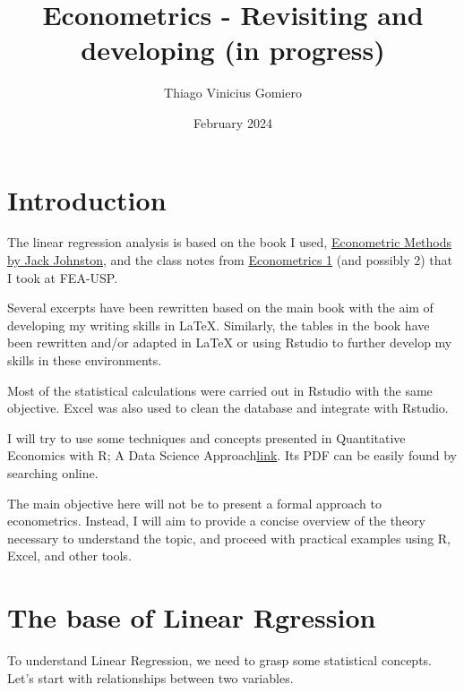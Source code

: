 \documentclass{article} %
\title{Econometrics - Revisiting and developing (in progress)} %
\author{Thiago  Vinicius Gomiero} %
\date{February 2024} %
\begin{document}


\maketitle %

\section{Introduction} %
The linear regression analysis is based on the book I used, \href{https://drive.google.com/file/d/1TIP3vEfFTzmsyAT_NdfeEucQ3Buzl79L/view?usp=sharing}{Econometric Methods by Jack Johnston}, and the class notes from \href{https://1drv.ms/o/s!AmlxSSt9Wu45_hK-coxj_ULKBVLC?e=dclINF}{Econometrics 1} (and possibly 2) that I took at FEA-USP.

Several excerpts have been rewritten based on the main book with the aim of developing my writing skills in LaTeX. Similarly, the tables in the book have been rewritten and/or adapted in LaTeX or using Rstudio to further develop my skills in these environments.

Most of the statistical calculations were carried out in Rstudio with the same objective. Excel was also used to clean the database and integrate with Rstudio.

I will try to use some techniques and concepts presented in Quantitative Economics with R; A Data Science Approach\href{https://link.springer.com/book/10.1007/978-981-15-2035-8}{link}. Its PDF can be easily found by searching online.

The main objective here will not be to present a formal approach to econometrics. Instead, I will aim to provide a concise overview of the theory necessary to understand the topic, and proceed with practical examples using R, Excel, and other tools.


\section{The base of Linear Rgression}
To understand Linear Regression, we need to grasp some statistical concepts.
Let's start with relationships between two variables.
\end{document}
